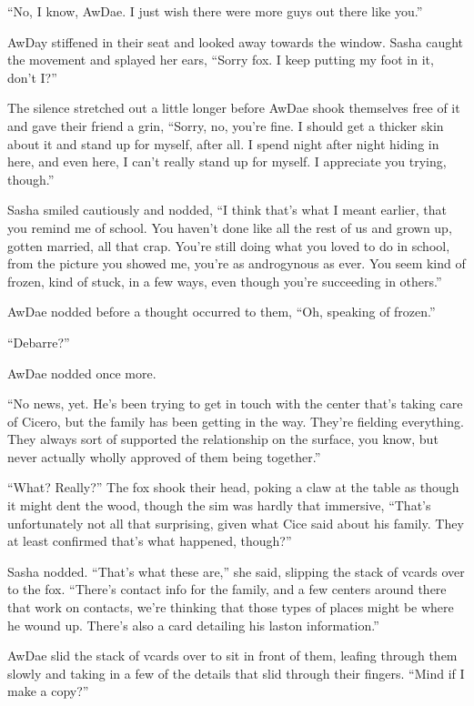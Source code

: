 ``No, I know, AwDae.  I just wish there were more guys out there like you.''

AwDay stiffened in their seat and looked away towards the window.  Sasha caught the movement and splayed her ears, ``Sorry fox.  I keep putting my foot in it, don't I?''

The silence stretched out a little longer before AwDae shook themselves free of it and gave their friend a grin, ``Sorry, no, you're fine.  I should get a thicker skin about it and stand up for myself, after all.  I spend night after night hiding in here, and even here, I can't really stand up for myself.  I appreciate you trying, though.''

Sasha smiled cautiously and nodded, ``I think that's what I meant earlier, that you remind me of school.  You haven't done like all the rest of us and grown up, gotten married, all that crap.  You're still doing what you loved to do in school, from the picture you showed me, you're as androgynous as ever.  You seem kind of frozen, kind of stuck, in a few ways, even though you're succeeding in others.''

AwDae nodded before a thought occurred to them, ``Oh, speaking of frozen.''

``Debarre?''

AwDae nodded once more.

``No news, yet.  He's been trying to get in touch with the center that's taking care of Cicero, but the family has been getting in the way.  They're fielding everything.  They always sort of supported the relationship on the surface, you know, but never actually wholly approved of them being together.''

``What?  Really?''  The fox shook their head, poking a claw at the table as though it might dent the wood, though the sim was hardly that immersive, ``That's unfortunately not all that surprising, given what Cice said about his family.  They at least confirmed that's what happened, though?''

Sasha nodded. ``That's what these are,'' she said, slipping the stack of vcards over to the fox.  ``There's contact info for the family, and a few centers around there that work on contacts, we're thinking that those types of places might be where he wound up.  There's also a card detailing his laston information.''

AwDae slid the stack of vcards over to sit in front of them, leafing through them slowly and taking in a few of the details that slid through their fingers.  ``Mind if I make a copy?''

